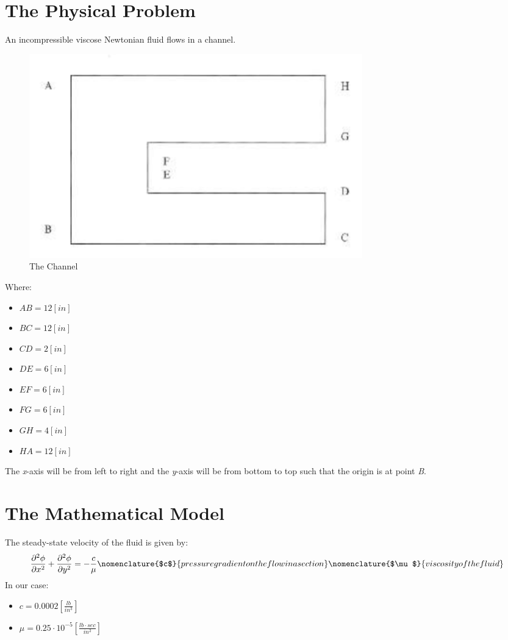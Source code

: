 \documentclass[11pt, a4paper]{article}
\newcommand{\parder}[2]{\frac{\partial {#1}}{\partial {#2}}}
\begin{document}
\pagestyle{fancy}
\setcounter{page}{1}

\section{The Physical Problem}
An incompressible viscose Newtonian fluid flows in a channel.
\begin{figure}[H]
    \centering
    \includegraphics[width=0.7\textwidth]{images/The channel.png}
    \caption{The Channel}
    \label{fig: The Channel}
\end{figure}
Where:
\begin{multicols}{2}
    \begin{itemize}
        \item $AB=12\left[in\right]$
        \item $BC=12\left[in\right]$
        \item $CD=2\left[in\right]$
        \item $DE=6\left[in\right]$
        \item $EF=6\left[in\right]$
        \item $FG=6\left[in\right]$
        \item $GH=4\left[in\right]$
        \item $HA=12\left[in\right]$
    \end{itemize}
\end{multicols}
\noindent The \emph{x}-axis will be from left to right and the \emph{y}-axis will be from bottom to top such that the origin is at point \emph{B}.

\section{The Mathematical Model}
The steady-state velocity of the fluid is given by:
\begin{equation}
    \parder{^2\phi}{x^2}+\parder{^2\phi}{y^2}=-\frac{c}{\mu}
    \nomenclature{$c$}{pressure gradient on the flow in a section}
    \nomenclature{$\mu$}{viscosity of the fluid}
\end{equation}
In our case:
\begin{itemize}
    \item $c=0.0002\left[\frac{lb}{in^3}\right]$
    \item $\mu=0.25\cdot10^{-5}\left[\frac{lb\cdot sec}{in^2}\right]$
\end{itemize}
\end{document}
